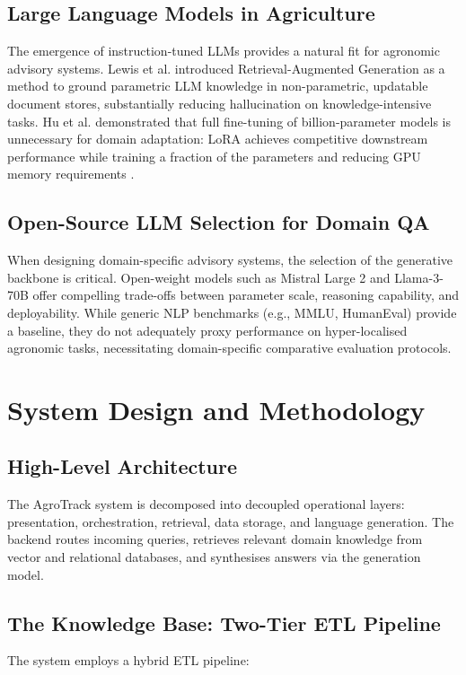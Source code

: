 \documentclass[10pt,twocolumn,letterpaper]{article}
\begin{document}
\subsection{Large Language Models in Agriculture}
The emergence of instruction-tuned LLMs provides a natural fit for agronomic advisory systems. Lewis et al. \cite{Lewis_2020} introduced Retrieval-Augmented Generation as a method to ground parametric LLM knowledge in non-parametric, updatable document stores, substantially reducing hallucination on knowledge-intensive tasks. Hu et al. \cite{Hu_2022} demonstrated that full fine-tuning of billion-parameter models is unnecessary for domain adaptation: LoRA achieves competitive downstream performance while training a fraction of the parameters and reducing GPU memory requirements \cite{Hu_2022}.

\subsection{Open-Source LLM Selection for Domain QA}
When designing domain-specific advisory systems, the selection of the generative backbone is critical. Open-weight models such as Mistral Large 2 and Llama-3-70B offer compelling trade-offs between parameter scale, reasoning capability, and deployability. While generic NLP benchmarks (e.g., MMLU, HumanEval) provide a baseline, they do not adequately proxy performance on hyper-localised agronomic tasks, necessitating domain-specific comparative evaluation protocols.

\section{System Design and Methodology}
\subsection{High-Level Architecture}
The AgroTrack system is decomposed into decoupled operational layers: presentation, orchestration, retrieval, data storage, and language generation. The backend routes incoming queries, retrieves relevant domain knowledge from vector and relational databases, and synthesises answers via the generation model.

\subsection{The Knowledge Base: Two-Tier ETL Pipeline}
The system employs a hybrid ETL pipeline:
\end{document}

